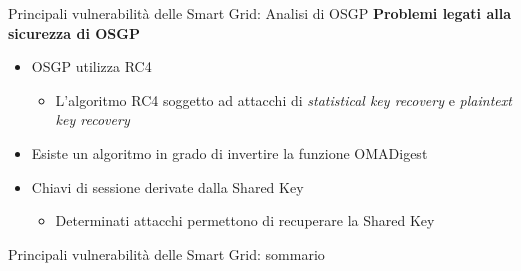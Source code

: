 
\begin{frame}{Principali vulnerabilità delle Smart Grid: Analisi di OSGP}
	\textbf{Problemi legati alla sicurezza di OSGP}	
	\begin{itemize}[<+- | alert@+>]
		\item OSGP utilizza RC4
		\begin{itemize}
			\item L'algoritmo RC4 soggetto ad attacchi di \emph{statistical key recovery} e \emph{plaintext key recovery}
		\end{itemize}			
		\item Esiste un algoritmo in grado di invertire la funzione OMADigest
		\item Chiavi di sessione derivate dalla Shared Key
			\begin{itemize}
				\item Determinati attacchi permettono di recuperare la Shared Key
			\end{itemize}
	\end{itemize}	
\end{frame}

\begin{frame}{Principali vulnerabilità delle Smart Grid: sommario}
\end{frame}


